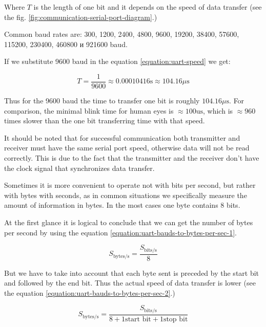 \documentclass[../sparc.tex]{subfiles}
\begin{document}
Where $T$ is the length of one bit and it depends on the speed of data transfer
(see the fig. \ref{fig:communication-serial-port-diagram}.)

Common baud rates are: 300, 1200, 2400, 4800, 9600, 19200, 38400, 57600, 115200,
230400, 460800 и 921600 baud.

If we substitute 9600 baud in the equation \ref{equation:uart-speed} we get:

\begin{equation}
  T = \frac{1}{9600} \approx 0.00010416 \mbox{s} \approx 104.16 \mu\mbox{s}
\end{equation}

Thus for the 9600 baud the time to transfer one bit is roughly $104.16
\mu\mbox{s}$.  For comparison, the minimal blink time for human eyes is $\approx100
\mbox{us}$\cite{chudler}, which is $\approx960$ times slower than the one bit
transferring time with that speed.

It should be noted that for successful communication both transmitter and
receiver must have the same serial port speed, otherwise data will not be read
correctly.  This is due to the fact that the transmitter and the receiver don't
have the clock signal that synchronizes data transfer.

Sometimes it is more convenient to operate not with bits per second, but rather
with bytes with seconds, as in common situations we specifically measure the
amount of information in bytes.  In the most cases one byte contains 8 bits.

At the first glance it is logical to conclude that we can get the number of
bytes per second by using the equation
\ref{equation:uart-bauds-to-bytes-per-sec-1}.

\begin{equation}
  S_{\mbox{bytes/s}} = \frac{S_{\mbox{bits/s}}}{8}
  \label{equation:uart-bauds-to-bytes-per-sec-1}
\end{equation}

But we have to take into account that each byte sent is preceded by the start
bit and followed by the end bit.  Thus the actual speed of data transfer is
lower (see the equation \ref{equation:uart-bauds-to-bytes-per-sec-2}.)

\begin{equation}
  S_{\mbox{bytes/s}} = \frac{S_{\mbox{bits/s}}}{8 + 1 \mbox{start bit} + 1 \mbox{stop bit}}
  \label{equation:uart-bauds-to-bytes-per-sec-2}
\end{equation}
\end{document}

